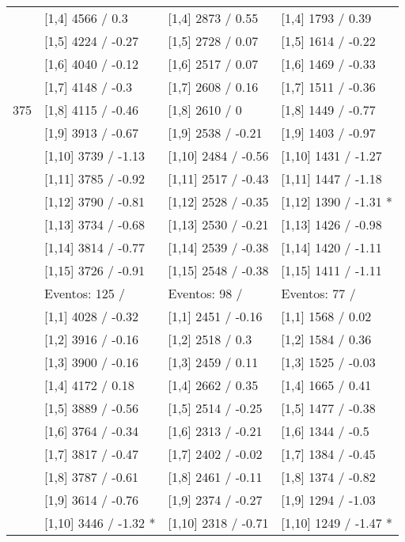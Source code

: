 \begin{table}
\begin{tabular}[t]{llll}
\addlinespace
 & {}[1,4] 4566  / 0.3 & {}[1,4] 2873  / 0.55 & {}[1,4] 1793  / 0.39\\
 & {}[1,5] 4224  / -0.27 & {}[1,5] 2728  / 0.07 & {}[1,5] 1614  / -0.22\\
 & {}[1,6] 4040  / -0.12 & {}[1,6] 2517  / 0.07 & {}[1,6] 1469  / -0.33\\
 & {}[1,7] 4148  / -0.3 & {}[1,7] 2608  / 0.16 & {}[1,7] 1511  / -0.36\\
375 & {}[1,8] 4115  / -0.46 & {}[1,8] 2610  / 0 & {}[1,8] 1449  / -0.77\\
\addlinespace
 & {}[1,9] 3913  / -0.67 & {}[1,9] 2538  / -0.21 & {}[1,9] 1403  / -0.97\\
 & {}[1,10] 3739  / -1.13 & {}[1,10] 2484  / -0.56 & {}[1,10] 1431  / -1.27\\
 & {}[1,11] 3785  / -0.92 & {}[1,11] 2517  / -0.43 & {}[1,11] 1447  / -1.18\\
 & {}[1,12] 3790  / -0.81 & {}[1,12] 2528  / -0.35 & {}[1,12] 1390  / -1.31 *\\
 & {}[1,13] 3734  / -0.68 & {}[1,13] 2530  / -0.21 & {}[1,13] 1426  / -0.98\\
\addlinespace
 & {}[1,14] 3814  / -0.77 & {}[1,14] 2539  / -0.38 & {}[1,14] 1420  / -1.11\\
 & {}[1,15] 3726  / -0.91 & {}[1,15] 2548  / -0.38 & {}[1,15] 1411  / -1.11\\
 & Eventos:  125 / & Eventos:  98 / & Eventos:  77 /\\
 & {}[1,1] 4028  / -0.32 & {}[1,1] 2451  / -0.16 & {}[1,1] 1568  / 0.02\\
 & {}[1,2] 3916  / -0.16 & {}[1,2] 2518  / 0.3 & {}[1,2] 1584  / 0.36\\
\addlinespace
 & {}[1,3] 3900  / -0.16 & {}[1,3] 2459  / 0.11 & {}[1,3] 1525  / -0.03\\
 & {}[1,4] 4172  / 0.18 & {}[1,4] 2662  / 0.35 & {}[1,4] 1665  / 0.41\\
 & {}[1,5] 3889  / -0.56 & {}[1,5] 2514  / -0.25 & {}[1,5] 1477  / -0.38\\
 & {}[1,6] 3764  / -0.34 & {}[1,6] 2313  / -0.21 & {}[1,6] 1344  / -0.5\\
 & {}[1,7] 3817  / -0.47 & {}[1,7] 2402  / -0.02 & {}[1,7] 1384  / -0.45\\
\addlinespace
500 & {}[1,8] 3787  / -0.61 & {}[1,8] 2461  / -0.11 & {}[1,8] 1374  / -0.82\\
 & {}[1,9] 3614  / -0.76 & {}[1,9] 2374  / -0.27 & {}[1,9] 1294  / -1.03\\
 & {}[1,10] 3446  / -1.32 * & {}[1,10] 2318  / -0.71 & {}[1,10] 1249  / -1.47 *\\

\end{tabular}
\end{table}

